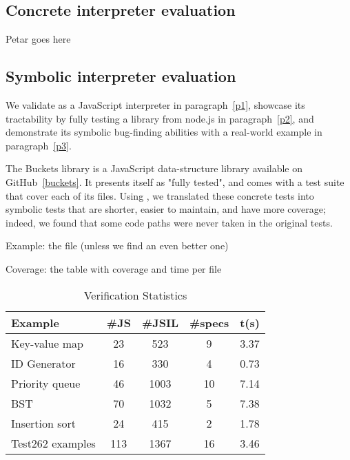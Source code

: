 
\subsection{Concrete interpreter evaluation}

Petar goes here

\subsection{Symbolic interpreter evaluation}

We validate \cosette as a JavaScript interpreter in paragraph~\ref{p1}, showcase its tractability by fully testing a library from node.js in paragraph~\ref{p2}, and demonstrate its symbolic bug-finding abilities with a real-world example in paragraph~\ref{p3}.



The Buckets library is a JavaScript data-structure library available on GitHub~\ref{buckets}.
It presents itself as "fully tested", and comes with a test suite that cover each of its files.
Using \cosette, we translated these concrete tests into symbolic tests that are shorter, easier to maintain, and have more coverage; indeed, we found that some code paths were never taken in the original tests.

Example: the  file (unless we find an even better one)

Coverage: the table with coverage and time per file

\begin{wraptable}{R}{0.5\textwidth}
{\small
	\centering
	\vspace*{-0.1cm}
	\caption{\cosette Verification Statistics}
	\label{tab:stats}
	\vspace*{-0.35cm}
    \begin{tabular}{|lcccc|}
    \hline
      {\bfseries Example} & {\bfseries \#JS} & {\bfseries \#JSIL} & {\bfseries \#specs} & {\bfseries t(s)} \\
      \hline
      Key-value map		&  23 &  523 &   9 &  3.37 \\
      ID Generator		&  16 &  330 &   4 &  0.73 \\ 
      Priority queue	&  46 & 1003 &  10 &  7.14 \\
      BST				&  70 & 1032 &   5 &  7.38 \\
      Insertion sort	&  24 &  415 &   2 &  1.78 \\
      Test262 examples  & 113 & 1367 &  16 &  3.46 \\
      \hline
   \end{tabular}
  }
  \vspace*{-0.4cm}
\end{wraptable}

